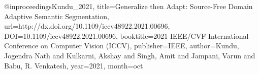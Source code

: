 @inproceedings{Kundu_2021, title={Generalize then Adapt: Source-Free Domain Adaptive Semantic Segmentation}, url={http://dx.doi.org/10.1109/iccv48922.2021.00696}, DOI={10.1109/iccv48922.2021.00696}, booktitle={2021 IEEE/CVF International Conference on Computer Vision (ICCV)}, publisher={IEEE}, author={Kundu, Jogendra Nath and Kulkarni, Akshay and Singh, Amit and Jampani, Varun and Babu, R. Venkatesh}, year={2021}, month=oct }